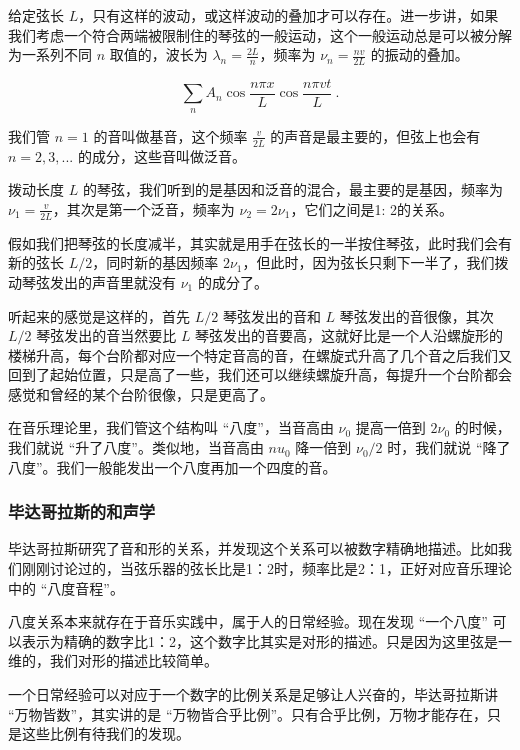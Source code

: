给定弦长 $L$，只有这样的波动，或这样波动的叠加才可以存在。进一步讲，如果我们考虑一个符合两端被限制住的琴弦的一般运动，这个一般运动总是可以被分解为一系列不同 $n$ 取值的，波长为 $\lambda_n = \frac{2L}{n}$，频率为 $\nu_n = \frac{n v}{2 L }$ 的振动的叠加。

\begin{equation}
\sum\limits_{n} A_n \cos \frac{n \pi x}{L} \cos \frac{n \pi vt}{L}~.
\end{equation}

我们管 $n = 1$ 的音叫做基音，这个频率 $\frac{v}{2L}$ 的声音是最主要的，但弦上也会有 $n= 2, 3, ...$ 的成分，这些音叫做泛音。

拨动长度 $L$ 的琴弦，我们听到的是基因和泛音的混合，最主要的是基因，频率为 $\nu_1 = \frac{v}{2L} $，其次是第一个泛音，频率为 $\nu_2 = 2 \nu_1$，它们之间是1: 2的关系。

假如我们把琴弦的长度减半，其实就是用手在弦长的一半按住琴弦，此时我们会有新的弦长 $L/2$，同时新的基因频率 $2 \nu_1$，但此时，因为弦长只剩下一半了，我们拨动琴弦发出的声音里就没有 $\nu_1$ 的成分了。

听起来的感觉是这样的，首先 $L/2$ 琴弦发出的音和 $L$ 琴弦发出的音很像，其次 $L/2$ 琴弦发出的音当然要比 $L$ 琴弦发出的音要高，这就好比是一个人沿螺旋形的楼梯升高，每个台阶都对应一个特定音高的音，在螺旋式升高了几个音之后我们又回到了起始位置，只是高了一些，我们还可以继续螺旋升高，每提升一个台阶都会感觉和曾经的某个台阶很像，只是更高了。

在音乐理论里，我们管这个结构叫 “八度”，当音高由 $\nu_0$ 提高一倍到 $2 \nu_0$ 的时候，我们就说 “升了八度”。类似地，当音高由 $nu_0$ 降一倍到 $\nu_0 /2$ 时，我们就说 “降了八度”。我们一般能发出一个八度再加一个四度的音。

\subsubsection{毕达哥拉斯的和声学}

毕达哥拉斯研究了音和形的关系，并发现这个关系可以被数字精确地描述。比如我们刚刚讨论过的，当弦乐器的弦长比是1：2时，频率比是2：1，正好对应音乐理论中的 “八度音程”。

八度关系本来就存在于音乐实践中，属于人的日常经验。现在发现 “一个八度” 可以表示为精确的数字比1：2，这个数字比其实是对形的描述。只是因为这里弦是一维的，我们对形的描述比较简单。

一个日常经验可以对应于一个数字的比例关系是足够让人兴奋的，毕达哥拉斯讲 “万物皆数”，其实讲的是 “万物皆合乎比例”。只有合乎比例，万物才能存在，只是这些比例有待我们的发现。

